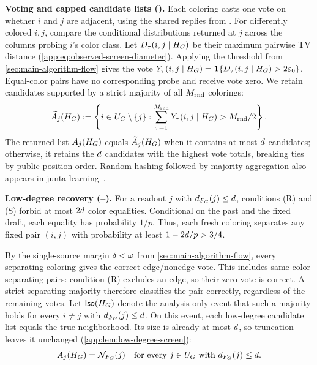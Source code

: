 {\textbf{Voting and capped candidate lists ().}
Each coloring casts one vote on whether $i$ and $j$ are adjacent, using
the shared replies from .
For differently colored $i,j$, compare the conditional distributions
returned at $j$ across the columns probing $i$'s color class.
Let $D_{\tau}(i,j\mid H_{G})$ be their maximum pairwise TV distance
(\cref{app:eq:observed-screen-diameter}).
Applying the threshold from \cref{sec:main-algorithm-flow} gives the vote
$Y_{\tau}(i,j\mid H_{G})
=\mathbf1\{D_{\tau}(i,j\mid H_{G})>2\varepsilon_0\}$.
Equal-color pairs have no corresponding probe and receive vote zero.
We retain candidates supported by a strict majority of all
$M_{\mathrm{rnd}}$ colorings:
\[
\widetilde A_{j}(H_{G}):=\left\{i\in U_{G}\setminus\{j\}:
\sum_{\tau=1}^{M_{\mathrm{rnd}}}Y_{\tau}(i,j\mid H_{G})>
M_{\mathrm{rnd}}/2\right\}.
\]
The returned list $A_{j}(H_{G})$ equals $\widetilde A_{j}(H_{G})$ when it contains
at most $d$ candidates; otherwise, it retains the $d$
candidates with the highest vote totals, breaking ties by public position order.
Random hashing followed by majority aggregation also appears in junta
learning~\citep{bshouty2018exact}.

\textbf{Low-degree recovery (--).}
For a readout $j$ with $d_{F_{G}}(j)\le d$,
conditions (R) and (S) forbid at most $2d$ color equalities.
Conditional on the past and the fixed draft, each equality has probability
$1/p$. Thus, each fresh coloring separates any fixed pair $(i,j)$ with
probability at least $1-2d/p>3/4$.

By the single-source margin $\delta<\omega$ from
\cref{sec:main-algorithm-flow}, every separating coloring gives the correct
edge/nonedge vote.
This includes same-color separating pairs: condition (R) excludes an edge,
so their zero vote is correct.
A strict separating majority therefore classifies the pair correctly,
regardless of the remaining votes.
Let $\mathsf{Iso}(H_{G})$ denote the analysis-only event that such a
majority holds for every $i\ne j$ with
$d_{F_{G}}(j)\le d$.
On this event, each low-degree candidate list equals the true neighborhood.
Its size is already at most $d$, so truncation leaves it
unchanged (\cref{app:lem:low-degree-screen}):
\begin{equation}
 A_{j}(H_{G})=\mathcal N_{F_{G}}(j)
 \quad\text{for every }j\in U_{G}
 \text{ with }d_{F_{G}}(j)\le d.
 \label{main:eq:exact-low-degree-row}
\end{equation}

}
